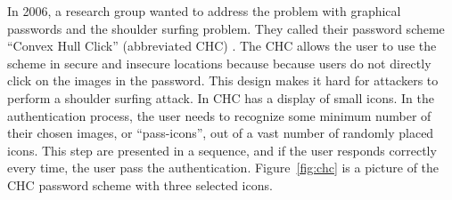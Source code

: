     \begin{figure}[H]
      \centering
    \end{figure}

  In 2006, a research group wanted to address the problem with graphical passwords and the shoulder surfing problem. They called their password scheme ``Convex Hull Click'' (abbreviated CHC) \cite{Wiedenbeck}. The CHC allows the user to use the scheme in secure and insecure locations because because users do not directly click on the images in the password. This design makes it hard for attackers to perform a shoulder surfing attack. In CHC has a display of small icons. In the authentication process, the user needs to recognize some minimum number of their chosen images, or ``pass-icons'', out of a vast number of randomly placed icons. This step are presented in a sequence, and if the user responds correctly every time, the user pass the authentication. Figure~\ref{fig:chc} is a picture of the CHC password scheme with three selected icons.

